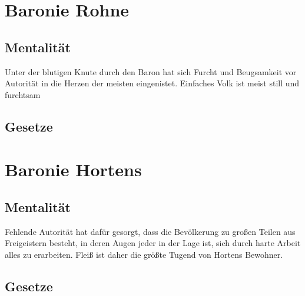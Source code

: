\documentclass[a4paper,12pt,oneside]{book}
\begin{document}
\section{Baronie Rohne}
\subsection{Mentalität}
Unter der blutigen Knute durch den Baron hat sich Furcht und Beugsamkeit vor Autorität in die Herzen der meisten eingenistet.  
Einfaches Volk ist meist still und furchtsam
\subsection{Gesetze}
 
\section{Baronie Hortens}
\subsection{Mentalität}
Fehlende Autorität hat dafür gesorgt, dass die Bevölkerung zu großen Teilen aus Freigeistern besteht, in deren Augen jeder in der Lage ist, sich durch harte Arbeit alles zu erarbeiten. Fleiß ist daher die größte Tugend von Hortens Bewohner.
\subsection{Gesetze}
\end{document}
